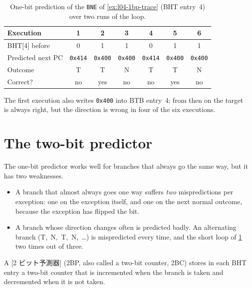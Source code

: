 \documentclass[../main.tex]{subfiles}
\begin{document}
\begin{table}[htbp]
  \centering\small
  \caption{One-bit prediction of the \texttt{BNE} of
    \cref{ex:l04-1bp-trace} (BHT entry~4) over two runs of the loop.}
  \label{tab:l04-1bp-trace}
  \begin{tabular}{@{}lcccccc@{}}
    \toprule
    Execution         & 1 & 2 & 3 & 4 & 5 & 6 \\
    \midrule
    BHT[4] before     & 0 & 1 & 1 & 0 & 1 & 1 \\
    Predicted next PC & \texttt{0x414} & \texttt{0x400} & \texttt{0x400} & \texttt{0x414} & \texttt{0x400} & \texttt{0x400} \\
    Outcome           & T & T & N & T & T & N \\
    Correct?          & no & yes & no & no & yes & no \\
    \bottomrule
  \end{tabular}
\end{table}

The first execution also writes \texttt{0x400} into BTB entry~4; from then
on the target is always right, but the direction is wrong in four of the six
executions.

\section{The two-bit predictor}
\label{sec:l04-2bp}

The one-bit predictor works well for branches that always go the same way,
but it has two weaknesses.
\begin{itemize}
  \item A branch that almost always goes one way suffers \emph{two}
    mispredictions per exception: one on the exception itself, and one on
    the next normal outcome, because the exception has flipped the bit.
  \item A branch whose direction changes often is predicted badly.  An
    alternating branch (T,~N,~T,~N,~\ldots) is mispredicted every time, and
    the short loop of \cref{tab:l04-1bp-trace} two times out of three.
\end{itemize}

\begin{definition}
  A [2 ビット予測器]
  (2BP,
  also called a two-bit counter, 2BC) stores in each BHT
  entry a two-bit counter that is incremented when the branch is taken and
  decremented when it is not taken.
\end{definition}
\end{document}

